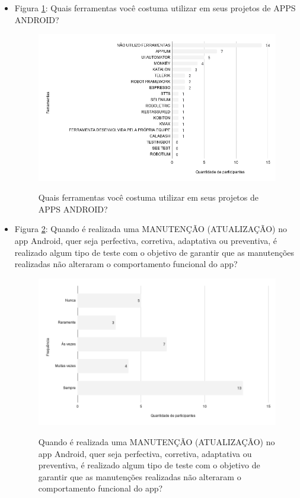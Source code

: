 \begin{itemize}
    
    \item Figura \ref{figure:s_ferramentastestes}: Quais ferramentas você costuma utilizar em seus projetos de APPS ANDROID?
        \begin{figure}[!htb]
        \centering
        \includegraphics[width=.80\textwidth]{images/s_ferramentastestes.png}
        \label{figure:s_ferramentastestes}
        \caption{Quais ferramentas você costuma utilizar em seus projetos de APPS ANDROID?}
        \end{figure}
    
    
    \item Figura \ref{figure:s_testemanutencao}: Quando é realizada uma MANUTENÇÃO (ATUALIZAÇÃO) no app Android, quer seja perfectiva, corretiva, adaptativa ou preventiva, é realizado algum tipo de teste com o objetivo de garantir que as manutenções realizadas não alteraram o comportamento funcional do app?
        \begin{figure}[!htb]
        \centering
        \includegraphics[width=.80\textwidth]{images/s_testemanutencao.png}
        \label{figure:s_testemanutencao}
        \caption{Quando é realizada uma MANUTENÇÃO (ATUALIZAÇÃO) no app Android, quer seja perfectiva, corretiva, adaptativa ou preventiva, é realizado algum tipo de teste com o objetivo de garantir que as manutenções realizadas não alteraram o comportamento funcional do app?}
        \end{figure}   
    

\end{itemize}
